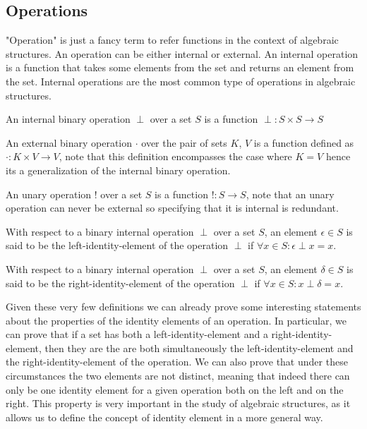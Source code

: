 
\subsection{Operations}
"Operation" is just a fancy term to refer functions in the context of algebraic structures. An operation can be either 
internal or external. An internal operation is a function that takes some elements from the set and returns an element from the set. Internal 
operations are the most common type of operations in algebraic structures.

\begin{definition}
    An internal binary operation $\perp$ over a set $S$ is a function $\perp: S \times S \rightarrow S$
\end{definition}

\begin{definition}
    An external binary operation $\cdot$ over the pair of sets $K$, $V$ is a function defined as $\cdot: K \times V \rightarrow V$, note 
    that this definition encompasses the case where $K = V$ hence its a generalization of the internal binary operation.
\end{definition}

\begin{definition}
    An unary operation $!$ over a set $S$ is a function $!: S \rightarrow S$, note that 
    an unary operation can never be external so specifying that it is internal is redundant.
\end{definition}

\begin{definition}
    With respect to a binary internal operation $\perp$ over a set $S$, an element $\epsilon \in S$ is said to be the left-identity-element of 
    the operation $\perp$ if $\forall x \in S: \epsilon \perp x = x$.
\end{definition}

\begin{definition}
    With respect to a binary internal operation $\perp$ over a set $S$, an element $\delta \in S$ is said to be the right-identity-element of 
    the operation $\perp$ if $\forall x \in S: x \perp \delta = x$.
\end{definition}

Given these very few definitions we can already prove some interesting statements about the properties of the identity elements of an operation. In 
particular, we can prove that if a set has both a left-identity-element and a right-identity-element, then they are the are both simultaneously the
left-identity-element and the right-identity-element of the operation. We can also prove that under these circumstances the two elements are not distinct, meaning 
that indeed there can only be one identity element for a given operation both on the left and on the right. This property is very important in the study of algebraic
structures, as it allows us to define the concept of identity element in a more general way.

